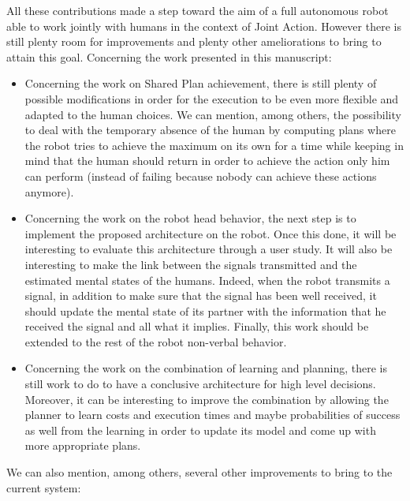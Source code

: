 \documentclass[english, a4paper,11pt,twoside]{StyleThese}
\begin{document}
All these contributions made a step toward the aim of a full autonomous robot able to work jointly with humans in the context of Joint Action. However there is still plenty room for improvements and plenty other ameliorations to bring to attain this goal. Concerning the work presented in this manuscript:
\begin{itemize}
\item Concerning the work on Shared Plan achievement, there is still plenty of possible modifications in order for the execution to be even more flexible and adapted to the human choices. We can mention, among others, the possibility to deal with the temporary absence of the human by computing plans where the robot tries to achieve the maximum on its own for a time while keeping in mind that the human should return in order to achieve the action only him can perform (instead of failing because nobody can achieve these actions anymore).
\item Concerning the work on the robot head behavior, the next step is to implement the proposed architecture on the robot. Once this done, it will be interesting to evaluate this architecture through a user study. It will also be interesting to make the link between the signals transmitted and the estimated mental states of the humans. Indeed, when the robot transmits a signal, in addition to make sure that the signal has been well received, it should update the mental state of its partner with the information that he received the signal and all what it implies. Finally, this work should be extended to the rest of the robot non-verbal behavior.
\item Concerning the work on the combination of learning and planning, there is still work to do to have a conclusive architecture for high level decisions. Moreover, it can be interesting to improve the combination by allowing the planner to learn costs and execution times and maybe probabilities of success as well from the learning in order to update its model and come up with more appropriate plans.
\end{itemize}
We can also mention, among others, several other improvements to bring to the current system:
\end{document}

